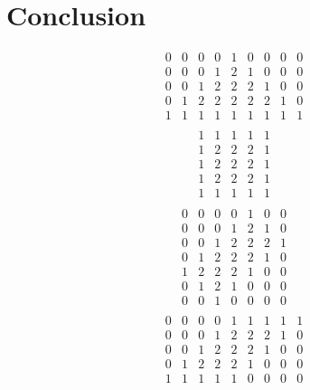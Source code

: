 \documentclass[12pt]{article}
\begin{document}
\graphicspath{{.}}  %

\pagestyle{fancy}
\tableofcontents 
\newpage
\setcounter{page}{1}

\section{Conclusion}

\begin{equation}
	\begin{matrix}
		0&0&0&0&1&0&0&0&0\\
		0&0&0&1&2&1&0&0&0\\
		0&0&1&2&2&2&1&0&0\\
		0&1&2&2&2&2&2&1&0\\
		1&1&1&1&1&1&1&1&1\\
	\end{matrix}
\end{equation}
\begin{equation}
	\begin{matrix}
		1&1&1&1&1\\
		1&2&2&2&1\\
		1&2&2&2&1\\
		1&2&2&2&1\\
		1&1&1&1&1\\
	\end{matrix}
\end{equation}
\begin{equation}
	\begin{matrix}
		0&0&0&0&1&0&0\\
		0&0&0&1&2&1&0\\
		0&0&1&2&2&2&1\\
		0&1&2&2&2&1&0\\
		1&2&2&2&1&0&0\\
		0&1&2&1&0&0&0\\
		0&0&1&0&0&0&0\\
	\end{matrix}
\end{equation}
\begin{equation}
	\begin{matrix}
		0&0&0&0&1&1&1&1&1\\
		0&0&0&1&2&2&2&1&0\\
		0&0&1&2&2&2&1&0&0\\
		0&1&2&2&2&1&0&0&0\\
		1&1&1&1&1&0&0&0&0\\
	\end{matrix}
\end{equation}
\end{document}
